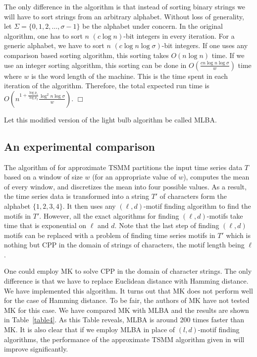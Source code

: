 \documentclass{article}
\theoremstyle{definition}
\theoremstyle{remark}
\begin{document}
 The only difference in the algorithm is that instead of sorting binary strings we will have to sort strings from an arbitrary alphabet. Without loss of generality, let $\Sigma=\{0,1,2,\ldots,\sigma-1\}$ be the alphabet under concern. In the original algorithm, one has to sort $n$ $(c\log n)$-bit integers in every iteration. For a generic alphabet, we have to sort $n$ $(c\log n\log \sigma)$-bit integers. If one uses any comparison based sorting algorithm, this sorting takes $O(n\log n)$ time. If we use an integer sorting algorithm, this sorting can be done in $O\left (\frac{cn\log n\log \sigma}{w}\right )$ time where $w$ is the word length of the machine. This is the time spent in each iteration of the algorithm. Therefore, the total expected run time is $O\left (n^{1+\frac{\log p_1}{\log p_2}}\frac{\log^2 n\log\sigma}{w}\right )$. $\Box$

Let this modified version of the light bulb algorithm be called MLBA.

\subsection{An experimental comparison}
The algorithm of \cite{BES03} for approximate TSMM partitions the input time series data $T$ based on a window of size $w$ (for an appropriate value of $w$), computes the mean of every window, and discretizes the mean into four possible values. As a result, the time series data is transformed into a string $T'$ of characters form the alphabet $\{1,2,3,4\}$. It then uses any $(\ell,d)$-motif finding algorithm to find the motifs in $T'$. However, all the exact algorithms for finding $(\ell,d)$-motifs take time that is exponential on $\ell$ and $d$. Note that the last step of finding $(\ell,d)$ motifs can be replaced with a problem of finding time series motifs in $T'$ which is nothing but CPP in the domain of strings of characters, the motif length being $\ell$.

One could employ MK to solve CPP in the domain of character strings. The only difference is that we have to replace Euclidean distance with Hamming distance. We have implemented this algorithm. It turns out that MK does not perform well for the case of Hamming distance. To be fair, the authors of MK have not tested MK for this case. We have compared MK with MLBA and the results are shown in Table~\ref{table4}. As this Table reveals, MLBA is around 200 times faster than MK. It is also clear that if we employ MLBA in place of $(l,d)$-motif finding algorithms, the performance of the approximate TSMM algorithm given in \cite{BES03} will improve significantly.
\end{document}
